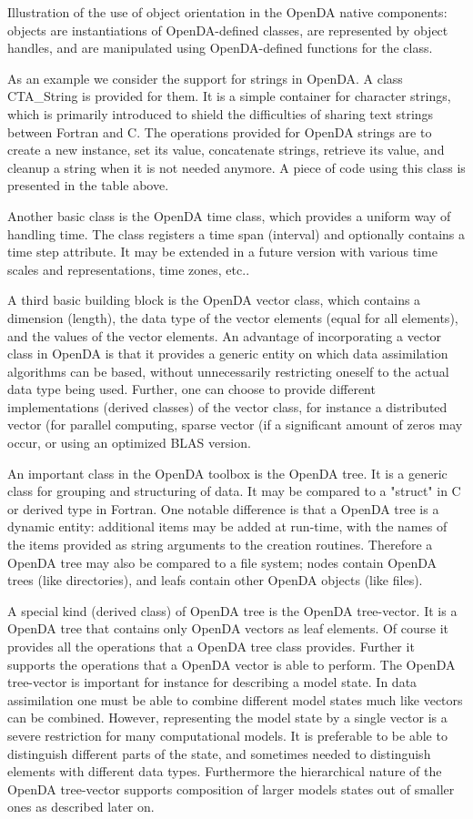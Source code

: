 Illustration of the use of object orientation in the OpenDA native components: objects are instantiations of OpenDA-defined classes, are represented by object handles, and are manipulated using OpenDA-defined functions for the class.

As an example we consider the support for strings in OpenDA. A class CTA\_String is provided for them. It is a simple container for character strings, which is primarily introduced to shield the difficulties of sharing text strings between Fortran and C. The operations provided for OpenDA strings are to create a new instance, set its value, concatenate strings, retrieve its value, and cleanup a string when it is not needed anymore. A piece of code using this class is presented in the table above.

Another basic class is the OpenDA time class, which provides a uniform way of handling time. The class registers a time span (interval) and optionally contains a time step attribute. It may be extended in a future version with various time scales and representations, time zones, etc..

A third basic building block is the OpenDA vector class, which contains a dimension (length), the data type of the vector elements (equal for all elements), and the values of the vector elements. An advantage of incorporating a vector class in OpenDA is that it provides a generic entity on which data assimilation algorithms can be based, without unnecessarily restricting oneself to the actual data type being used. Further, one can choose to provide different implementations (derived classes) of the vector class, for instance a distributed vector (for parallel computing, sparse vector (if a significant amount of zeros may occur, or using an optimized BLAS version.

An important class in the OpenDA toolbox is the OpenDA tree. It is a generic class for grouping and structuring of data. It may be compared to a "struct" in C or derived type in Fortran. One notable difference is that a OpenDA tree is a dynamic entity: additional items may be added at run-time, with the names of the items provided as string arguments to the creation routines. Therefore a OpenDA tree may also be compared to a file system; nodes contain OpenDA trees (like directories), and leafs contain other OpenDA objects (like files).

A special kind (derived class) of OpenDA tree is the OpenDA tree-vector. It is a OpenDA tree that contains only OpenDA vectors as leaf elements. Of course it provides all the operations that a OpenDA tree class provides. Further it supports the operations that a OpenDA vector is able to perform. The OpenDA tree-vector is important for instance for describing a model state. In data assimilation one must be able to combine different model states much like vectors can be combined. However, representing the model state by a single vector is a severe restriction for many computational models. It is preferable to be able to distinguish different parts of the state, and sometimes needed to distinguish elements with different data types. Furthermore the hierarchical nature of the OpenDA tree-vector supports composition of larger models states out of smaller ones as described later on.

